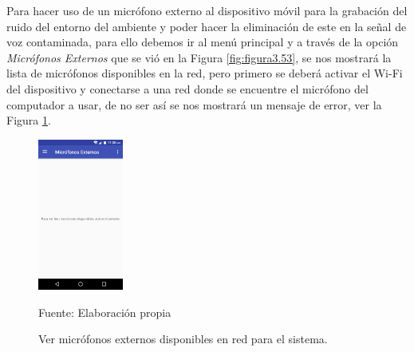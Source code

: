 Para hacer uso de un micrófono externo al dispositivo móvil para la grabación del ruido del entorno del ambiente y poder hacer la eliminación de este en la señal de voz contaminada, para ello debemos ir al menú principal y a través de la opción \textit{Micrófonos Externos} que se vió en la Figura \ref{fig:figura3.53}, se nos mostrará la lista de micrófonos disponibles en la red, pero primero se deberá activar el Wi-Fi del dispositivo y conectarse a una red donde se encuentre el micrófono del computador a usar, de no ser así se nos mostrará un mensaje de error, ver la Figura \ref{fig:figura3.55}.
\begin{figure}[H]
\captionsetup{justification=centering}
\begin{center}
\includegraphics[width=0.25\textwidth]{Imagenes/Cap3/image055}
\end{center}
\begin{center}
\vskip -0.5cm
\caption{\small{Ver micrófonos externos disponibles en red para el sistema.}}
\label{fig:figura3.55}
{\small{Fuente: Elaboración propia}}
\end{center}
\end{figure}

